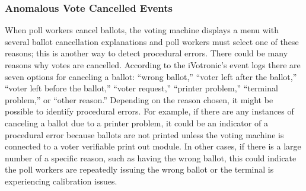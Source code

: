 \subsubsection{Anomalous Vote Cancelled Events}
When poll workers cancel ballots, the voting machine displays a menu with several ballot cancellation explanations and poll workers must select one of these reasons; this is another way to detect procedural errors. There could be many reasons why votes are cancelled. According to the iVotronic’s event logs there are seven options for canceling a ballot: \textquotedblleft wrong ballot,\textquotedblright \hspace{1 mm} \textquotedblleft voter left after the ballot,\textquotedblright \hspace{1 mm}  \textquotedblleft voter left before the ballot,\textquotedblright \hspace{1 mm}  \textquotedblleft voter request,\textquotedblright \hspace{1 mm}  \textquotedblleft printer problem,\textquotedblright \hspace{1 mm}  \textquotedblleft terminal problem,\textquotedblright \hspace{1 mm}  or \textquotedblleft other reason.\textquotedblright \hspace{2 mm}  Depending on the reason chosen, it might be possible to identify procedural errors.  For example, if there are any instances of canceling a ballot due to a printer problem, it could be an indicator of a procedural error because ballots are not printed unless the voting machine is connected to a voter verifiable print out module. In other cases, if there is a large number of a specific reason, such as having the wrong ballot, this could indicate the poll workers are repeatedly issuing the wrong ballot or the terminal is experiencing calibration issues.  

